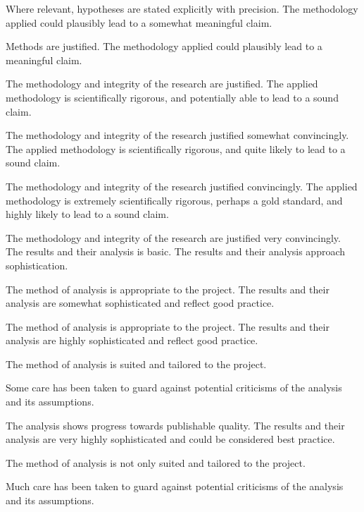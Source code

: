 \documentclass{../fal_assignment}
\begin{document}
\begin{markingrubric}
      \par		Where relevant, hypotheses are stated explicitly with precision.
        \grade\fail 
        \grade 		The methodology applied could plausibly lead to a somewhat meaningful claim.
        \par		Methods are justified.
        \grade 		The methodology applied could plausibly lead to a meaningful claim.
        \par		The methodology and integrity of the research are justified.
        \grade 		The applied methodology is scientifically rigorous, and potentially able to lead to a sound claim.
        \par		The methodology and integrity of the research justified somewhat convincingly.
        \grade 		The applied methodology is scientifically rigorous, and quite likely to lead to a sound claim.
        \par		The methodology and integrity of the research justified convincingly.
        \grade 		The applied methodology is extremely scientifically rigorous, perhaps a gold standard, and highly likely to lead to a sound claim.
        \par		The methodology and integrity of the research are justified very convincingly.
        \grade\fail 
        \grade 		The results and their analysis is basic.
        \grade 		The results and their analysis approach sophistication.
        \par 		The method of analysis is appropriate to the project.
        \grade 		The results and their analysis are somewhat sophisticated and reflect good practice.
        \par 		The method of analysis is appropriate to the project.
        \grade 		The results and their analysis are highly sophisticated and reflect good practice.
        \par 		The method of analysis is suited and tailored to the project.
       \par 		Some care has been taken to guard against potential criticisms of the analysis and its assumptions.
        \par		The analysis shows progress towards publishable quality.
        \grade 		The results and their analysis are very highly sophisticated and could be considered best practice.
        \par 		The method of analysis is not only suited and tailored to the project.
        \par 		Much care has been taken to guard against potential criticisms of the analysis and its assumptions.

\end{markingrubric}
\end{document}
